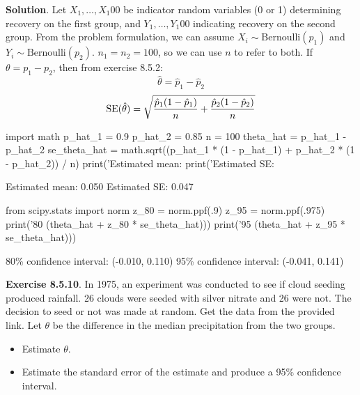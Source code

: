 \textbf{Solution}. Let \(X_{1}, \dots, X_{1}00\) be indicator random
variables (0 or 1) determining recovery on the first group, and
\(Y_{1}, \dots, Y_{1}00\) indicating recovery on the second group. From the
problem formulation, we can assume \(X_{i} \sim \text{Bernoulli}(p_{1})\)
and \(Y_{i} \sim \text{Bernoulli}(p_{2})\). \(n_{1} = n_{2} = 100\), so we can
use \(n\) to refer to both.
If \(\theta = p_{1} - p_{2}\), then from exercise 8.5.2:
\[
\hat{\theta} = \hat{p}_{1} - \hat{p}_{2}
\]
\[
\operatorname{\mathrm{SE}} (\hat{\theta}) = \sqrt{\frac{\hat{p}_{1}(1 - \hat{p}_{1})}{n} + \frac{\hat{p}_{2}(1 - \hat{p}_{2})}{n}}
\]

\begin{python}
import math
p_hat_1 = 0.9
p_hat_2 = 0.85
n = 100
theta_hat = p_hat_1 - p_hat_2
se_theta_hat = math.sqrt((p_hat_1 * (1 - p_hat_1) + p_hat_2 * (1 - p_hat_2)) / n)
print('Estimated mean: %
print('Estimated SE: %
\end{python}
\begin{console}
Estimated mean: 0.050
Estimated SE: 0.047
\end{console}

\begin{python}
from scipy.stats import norm
z_80 = norm.ppf(.9)
z_95 = norm.ppf(.975)
print('80%
                                                 (theta_hat + z_80 * se_theta_hat)))
print('95%
                                                 (theta_hat + z_95 * se_theta_hat)))
\end{python}
\begin{console}
80\% confidence interval: (-0.010, 0.110)
95\% confidence interval: (-0.041, 0.141)
\end{console}

\textbf{Exercise 8.5.10}. In 1975, an experiment was conducted to see if
cloud seeding produced rainfall. 26 clouds were seeded with silver
nitrate and 26 were not. The decision to seed or not was made at random.
Get the data from the provided link.
Let \(\theta\) be the difference in the median precipitation from the
two groups.
\begin{itemize}[tightlist]
\item
  Estimate \(\theta\).
\item
  Estimate the standard error of the estimate and produce a 95\%
  confidence interval.
\end{itemize}

